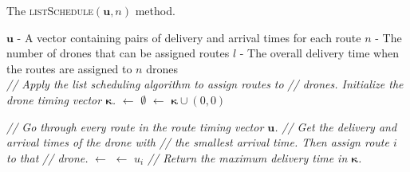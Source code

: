 \documentclass[journal]{IEEEtran}
\begin{document}
\begin{algorithm}[t!]
\caption{The \textsc{listSchedule}$({\ensuremath{\mathbf{u}}},{\ensuremath{n}})$ method.}
\label{alg:list-schedule}
\begin{algorithmic}
\Require
\Statex ${\ensuremath{\mathbf{u}}}$ - A vector containing pairs of delivery and arrival times for each route
\Statex ${\ensuremath{n}}$ - The number of drones that can be assigned routes
\Ensure
\Statex ${\ensuremath{l}}$ - The overall delivery time when the routes are assigned to ${\ensuremath{n}}$ drones
\\
\State \emph{// Apply the list scheduling algorithm to assign routes to}
\State \emph{// drones. Initialize the drone timing vector ${\ensuremath{\boldsymbol{\kappa}}}$.}
{\State {${\ensuremath{\boldsymbol{\kappa}}}$} $\gets$ {$\emptyset$}}
{\State {${\ensuremath{\boldsymbol{\kappa}}}$} $\gets$ {${\ensuremath{\boldsymbol{\kappa}}} \cup (0,0)$}}
\EndFor

\State \emph{// Go through every route in the route timing vector ${\ensuremath{\mathbf{u}}}$.}
\State \emph{// Get the delivery and arrival times of the drone with}
\State \emph{// the smallest arrival time. Then assign route $i$ to that}
\State \emph{//  drone.}
{ $\gets$ {}}
{ $\gets$ {${\ensuremath{u_{{i}}}}$}}
\State {}
\EndFor
\State \emph{// Return the maximum delivery time in ${\ensuremath{\boldsymbol{\kappa}}}$.}
\\
\Return {}

\end{algorithmic}
\end{algorithm}
\end{document}
